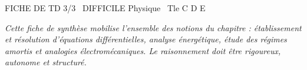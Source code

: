 \documentclass[11pt]{article}
\begin{document}
\pagestyle{empty}

\begin{tcolorbox}[enhanced,colback=popink,colframe=popink,arc=10pt,boxrule=0pt,left=12pt,right=12pt,top=9pt,bottom=9pt]
{\color{white}\popxbold\small FICHE DE TD 3/3 \textbullet\ DIFFICILE \hfill Physique \textbullet\ Tle C D E\par}
\end{tcolorbox}
\vspace{4pt}
\emph{Cette fiche de synthèse mobilise l'ensemble des notions du chapitre : établissement et résolution d'équations différentielles, analyse énergétique, étude des régimes amortis et analogies électromécaniques. Le raisonnement doit être rigoureux, autonome et structuré.}
\end{document}
